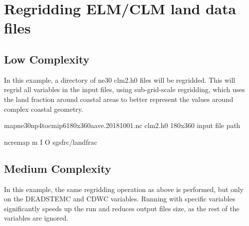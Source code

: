 \documentclass[letterpaper,10pt,english]{sphinxmanual}
\begin{document}
\section{Regridding ELM/CLM land data files}
\label{\detokenize{lnd_regrid:regridding-elm-clm-land-data-files}}

\subsection{Low Complexity}
\label{\detokenize{lnd_regrid:low-complexity}}
In this example, a directory of ne30 clm2.h0 files will be regridded. This will regrid all variables in the input files, using sub-grid-scale
regridding, which uses the land fraction around coastal areas to better represent the values around complex coastal geometry.

\begin{sphinxVerbatim}[commandchars=\\\{\}]
map\PYGZus{}ne30np4\PYGZus{}to\PYGZus{}cmip6\PYGZus{}180x360\PYGZus{}aave.20181001.nc   
clm2.h0                                       
180x360                                      
\PYGZlt{}input file path\PYGZgt{}                             

ncremap \PYGZhy{}m  \PYGZhy{}I  \PYGZhy{}O  \PYGZhy{}\PYGZhy{}sgs\PYGZus{}frc/landfrac
\end{sphinxVerbatim}


\subsection{Medium Complexity}
\label{\detokenize{lnd_regrid:medium-complexity}}
In this example, the same regridding operation as above is performed, but only on the DEADSTEMC and CDWC variables.
Running with specific variables significantly speeds up the run and reduces output files size, as the rest of the variables are ignored.
\end{document}
